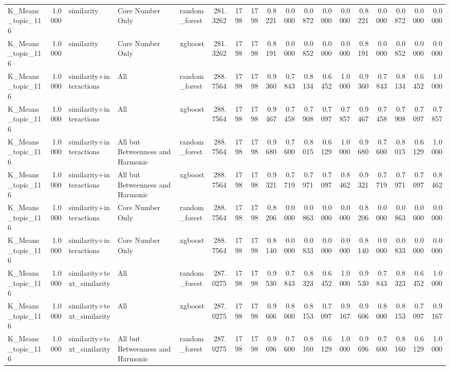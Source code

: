 \begin{tabular}{lrlllrrrrrrrrrrrrr}
K_Means_topic_116 & 1.0000 & similarity & Core Number Only & random_forest & 281.3262 & 1798 & 1798 & 0.8221 & 0.0000 & 0.0872 & 0.0000 & 0.0000 & 0.8221 & 0.0000 & 0.0872 & 0.0000 & 0.0000 \\
K_Means_topic_116 & 1.0000 & similarity & Core Number Only & xgboost & 281.3262 & 1798 & 1798 & 0.8191 & 0.0000 & 0.0852 & 0.0000 & 0.0000 & 0.8191 & 0.0000 & 0.0852 & 0.0000 & 0.0000 \\
K_Means_topic_116 & 1.0000 & similarity+interactions & All & random_forest & 288.7564 & 1798 & 1798 & 0.9360 & 0.7843 & 0.8134 & 0.6452 & 1.0000 & 0.9360 & 0.7843 & 0.8134 & 0.6452 & 1.0000 \\
K_Means_topic_116 & 1.0000 & similarity+interactions & All & xgboost & 288.7564 & 1798 & 1798 & 0.9467 & 0.7458 & 0.7908 & 0.7097 & 0.7857 & 0.9467 & 0.7458 & 0.7908 & 0.7097 & 0.7857 \\
K_Means_topic_116 & 1.0000 & similarity+interactions & All but Betweenness and Harmonic & random_forest & 288.7564 & 1798 & 1798 & 0.9680 & 0.7600 & 0.8015 & 0.6129 & 1.0000 & 0.9680 & 0.7600 & 0.8015 & 0.6129 & 1.0000 \\
K_Means_topic_116 & 1.0000 & similarity+interactions & All but Betweenness and Harmonic & xgboost & 288.7564 & 1798 & 1798 & 0.9321 & 0.7719 & 0.7971 & 0.7097 & 0.8462 & 0.9321 & 0.7719 & 0.7971 & 0.7097 & 0.8462 \\
K_Means_topic_116 & 1.0000 & similarity+interactions & Core Number Only & random_forest & 288.7564 & 1798 & 1798 & 0.8206 & 0.0000 & 0.0863 & 0.0000 & 0.0000 & 0.8206 & 0.0000 & 0.0863 & 0.0000 & 0.0000 \\
K_Means_topic_116 & 1.0000 & similarity+interactions & Core Number Only & xgboost & 288.7564 & 1798 & 1798 & 0.8140 & 0.0000 & 0.0833 & 0.0000 & 0.0000 & 0.8140 & 0.0000 & 0.0833 & 0.0000 & 0.0000 \\
K_Means_topic_116 & 1.0000 & similarity+text_similarity & All & random_forest & 287.0275 & 1798 & 1798 & 0.9530 & 0.7843 & 0.8323 & 0.6452 & 1.0000 & 0.9530 & 0.7843 & 0.8323 & 0.6452 & 1.0000 \\
K_Means_topic_116 & 1.0000 & similarity+text_similarity & All & xgboost & 287.0275 & 1798 & 1798 & 0.9606 & 0.8000 & 0.8153 & 0.7097 & 0.9167 & 0.9606 & 0.8000 & 0.8153 & 0.7097 & 0.9167 \\
K_Means_topic_116 & 1.0000 & similarity+text_similarity & All but Betweenness and Harmonic & random_forest & 287.0275 & 1798 & 1798 & 0.9696 & 0.7600 & 0.8160 & 0.6129 & 1.0000 & 0.9696 & 0.7600 & 0.8160 & 0.6129 & 1.0000 \\

\end{tabular}

